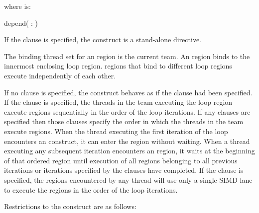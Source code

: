 where  is:
\begin{indentedcodelist}
depend( \plc{[}: \plc{vec]})
\end{indentedcodelist}
\fortranspecificend

If the  clause is specified, the  construct is a stand-alone directive.
 
\binding
The binding thread set for an  region is the current team. An  region 
binds to the innermost enclosing loop region.  regions that bind to different 
loop regions execute independently of each other.

\descr
If no clause is specified, the  construct behaves as if the  clause had been specified. If the  clause is specified, the threads in the team executing the loop region execute  regions sequentially in the order of the loop iterations. If any  clauses are specified then those clauses specify the order in which the threads in the team execute  regions. When the thread executing the first iteration of the loop encounters an  construct, it can enter the  region without waiting. When a thread executing any subsequent iteration encounters an  region, it waits at the beginning of that ordered region until execution of all  regions belonging to all previous iterations or iterations specified by the  clauses have completed. If the  clause is specified, the  regions encountered by any thread will use only a single SIMD lane to execute the  regions in the order of the loop iterations.

\restrictions
Restrictions to the  construct are as follows:

